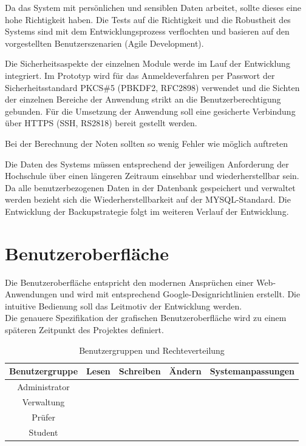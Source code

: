 		\begin{description}
			\item[Richtigkeit]  Da das System mit persönlichen und sensiblen Daten arbeitet, sollte dieses eine hohe Richtigkeit haben. Die Tests auf die Richtigkeit und die Robustheit des Systems sind mit dem Entwicklungsprozess verflochten und basieren auf den vorgestellten Benutzerszenarien (Agile Development). 
			\item[Sicherheit] Die Sicherheitsaspekte der einzelnen Module werde im Lauf der Entwicklung integriert.
			Im Prototyp wird für das Anmeldeverfahren per Passwort der Sicherheitsstandard PKCS\#5 (PBKDF2, RFC2898) verwendet und die Sichten der einzelnen Bereiche der Anwendung strikt an die Benutzerberechtigung gebunden. 
			Für die Umsetzung der Anwendung soll eine gesicherte Verbindung über HTTPS (SSH, RS2818) bereit gestellt werden.
			\item[Fehlertoleranz]  Bei der Berechnung der Noten sollten so wenig Fehler wie möglich auftreten 
			\item[Wiederherstellbarkeit]  Die Daten des Systems müssen entsprechend der jeweiligen Anforderung der Hochschule über einen längeren Zeitraum einsehbar und wiederherstellbar sein.
			Da alle benutzerbezogenen Daten in der Datenbank gespeichert und verwaltet werden bezieht sich die Wiederherstellbarkeit auf der MYSQL-Standard.
			Die Entwicklung der Backupstrategie folgt im weiteren Verlauf der Entwicklung.
		\end{description}	
	

	\section{Benutzeroberfläche}
	
	Die Benutzeroberfläche entspricht den modernen Ansprüchen einer Web-Anwendungen und wird mit entsprechend Google-Designrichtlinien erstellt. Die intuitive Bedienung soll das Leitmotiv der Entwicklung werden.\\
	
	Die genauere Spezifikation der grafischen Benutzeroberfläche wird zu einem späteren Zeitpunkt des Projektes definiert. 
	
	\begin{table}[ht]
	\caption{Benutzergruppen und Rechteverteilung}
	\begin{tabular}{|c|c|c|c|c|}
	\hline Benutzergruppe & Lesen & Schreiben & Ändern & Systemanpassungen \\ 
	\hline Administrator & \checkmark & \checkmark & \checkmark & \checkmark \\ 
	\hline Verwaltung & \checkmark & \checkmark & \checkmark &  \\ 
	\hline Prüfer & \checkmark & \checkmark &  &  \\ 
	\hline Student & \checkmark &  &  &  \\ 
	\hline 
	\end{tabular} 
	\label{tab:usergroup}
	\end{table}
	
